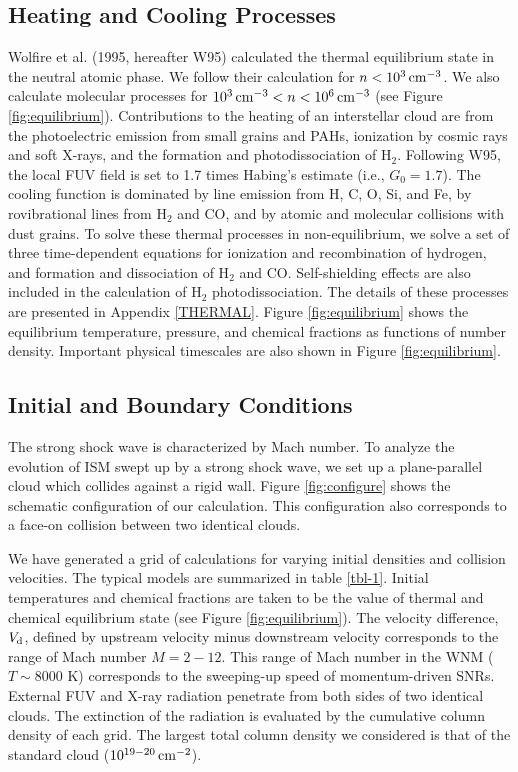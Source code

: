 \subsection{Heating and Cooling Processes}
Wolfire et al. (1995, hereafter W95) calculated the thermal equilibrium state 
in the neutral atomic phase.
We follow their calculation for $n<10^3 \, {\rm cm^{-3}}$.
We also calculate molecular processes for 
$10^3 \, {\rm cm^{-3}}<n<10^6 \, {\rm cm^{-3}}$
(see Figure \ref{fig:equilibrium}).
Contributions to the heating of an interstellar cloud are from 
the photoelectric emission from small grains and PAHs, 
ionization by cosmic rays and soft X-rays,
and the formation and photodissociation of H$_2$.
Following W95, the local FUV field is set to 1.7 times Habing's estimate 
(i.e., $G_0=1.7$).
The cooling function is dominated by line emission from H, 
C, O, Si, and Fe, 
by rovibrational lines from H$_2$ and CO, 
and by atomic and molecular collisions with dust grains.
To solve these thermal processes in non-equilibrium, 
we solve a set of 
three
time-dependent equations for ionization and recombination 
of hydrogen, and formation and dissociation of H$_2$ and CO.
Self-shielding effects are also included in the calculation of 
H$_2$ photodissociation.
The details of these processes are presented in Appendix \ref{THERMAL}.  
Figure \ref{fig:equilibrium} shows the equilibrium temperature, pressure,
and chemical fractions as functions of number density.
Important physical timescales are also shown in Figure \ref{fig:equilibrium}. 


\subsection{Initial and Boundary Conditions}

The strong shock wave is characterized by Mach number. 
To analyze the evolution of ISM swept up by a strong shock wave,
we set up a plane-parallel cloud which collides against a rigid wall.
Figure \ref{fig:configure} shows the schematic configuration of
our calculation.
This configuration also corresponds to a face-on collision between 
two identical clouds.

We have generated a grid of calculations for
varying initial densities and collision velocities.
The typical models are summarized in table \ref{tbl-1}. 
Initial temperatures and chemical fractions are taken to be
the value of thermal and chemical equilibrium state
(see Figure \ref{fig:equilibrium}).
The velocity difference, 
$V_{\rm d}$, defined by upstream velocity minus downstream 
velocity corresponds to the range of Mach number $M = 2 - 12$.
This range of Mach number in the WNM ($T \sim 8000$ K) corresponds to
the sweeping-up speed of momentum-driven SNRs.
External FUV and X-ray radiation penetrate from both sides of  
two identical clouds.
The extinction of the radiation is evaluated by 
the cumulative column density of each grid.
The largest total column density we considered is that of the
standard  cloud ($10^{19 - 20}\,{\rm cm^{-2}}$).

